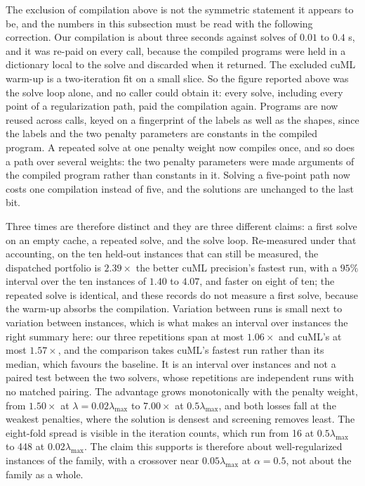 \documentclass[11pt]{article}
\begin{document}
The exclusion of compilation above is not the symmetric statement it appears to be,
and the numbers in this subsection must be read with the following correction. Our
compilation is about three seconds against solves of $0.01$ to $0.4$ s, and it was re-paid on every call, because the compiled programs were held in a
dictionary local to the solve and discarded when it returned. The excluded cuML
warm-up is a two-iteration fit on a small slice. So the figure reported above was the
solve loop alone, and no caller could obtain it: every solve, including every point of
a regularization path, paid the compilation again. Programs are now reused across
calls, keyed on a fingerprint of the labels as well as the shapes, since the labels and
the two penalty parameters are constants in the compiled program. A repeated solve at
one penalty weight now compiles once, and so does a path over several weights: the two
penalty parameters were made arguments of the compiled program rather than constants
in it. Solving a five-point path now costs one compilation instead of five, and the
solutions are unchanged to the last bit.

Three times are therefore distinct and they are three different claims: a first solve
on an empty cache, a repeated solve, and the solve loop. Re-measured under that
accounting, on the ten held-out instances that can still be measured, the dispatched
portfolio is $2.39\times$ the better cuML precision's fastest run, with a $95\%$
interval over the ten instances of $1.40$ to $4.07$, and faster on eight of ten; the
repeated solve is identical, and these records do not measure a first solve, because
the warm-up absorbs the compilation. Variation between runs is small next to variation
between instances, which is what makes an interval over instances the right summary
here: our three repetitions span at most $1.06\times$ and cuML's at most $1.57\times$,
and the comparison takes cuML's fastest run rather than its median, which favours the
baseline. It is an interval over instances and not a paired test between the two
solvers, whose repetitions are independent runs with no matched pairing. The advantage grows monotonically with
the penalty weight, from $1.50\times$ at $\lambda = 0.02\lambda_{\max}$ to
$7.00\times$ at $0.5\lambda_{\max}$, and both losses fall at the weakest penalties,
where the solution is densest and screening removes least. The eight-fold spread is
visible in the iteration counts, which run from 16 at $0.5\lambda_{\max}$ to 448 at
$0.02\lambda_{\max}$. The claim this supports is therefore about well-regularized
instances of the family, with a crossover near $0.05\lambda_{\max}$ at $\alpha=0.5$,
not about the family as a whole.
\end{document}
